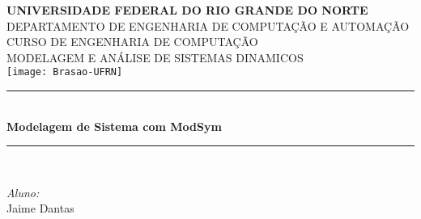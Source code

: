 \documentclass[12pt]{report}
\begin{document}
\setmainfont{CMU Serif}%

\begin{titlepage}

\newcommand{\HRule}{\rule{\linewidth}{0.5mm}} %

\center %
 

\textsc{\large\bfseries UNIVERSIDADE FEDERAL DO RIO GRANDE DO NORTE\\}%
\vspace{4mm}
\textsc{ DEPARTAMENTO DE ENGENHARIA DE COMPUTAÇ\~AO E AUTOMAÇ\~AO\\} %
\vspace{4mm}
\textsc{ CURSO DE ENGENHARIA DE COMPUTAÇ\~AO}\\ %
\vspace{4mm}
\textsc{ MODELAGEM E ANÁLISE DE SISTEMAS DINA\̂MICOS}\\ %
\vspace{1cm}
\texttt{[image: Brasao-UFRN]} %
 

\HRule \\[0.4cm]
{ \huge \bfseries Modelagem de Sistema com ModSym} %
\HRule \\[2.5cm]
 

\begin{minipage}{0.45\textwidth}
\begin{flushleft} \large
\emph{Aluno:}\\
Jaime Dantas


\end{flushleft}
\end{minipage}
\end{titlepage}
\end{document}
